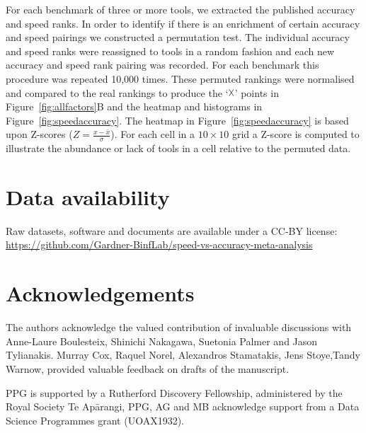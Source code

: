 \documentclass[fleqn,10pt]{SelfArx} %
\begin{document}
For each benchmark of three or more tools, we extracted the published
accuracy and speed ranks. In order to identify if there is an
enrichment of certain accuracy and speed pairings we constructed a
permutation test. The individual accuracy and speed ranks were
reassigned to tools in a random fashion and each new accuracy and
speed rank pairing was recorded. For each benchmark this procedure was
repeated 10,000 times. These permuted rankings were normalised and
compared to the real rankings to produce the ‘$\vartimes$’ points in
Figure~\ref{fig:allfactors}B and the heatmap and histograms in
Figure~\ref{fig:speedaccuracy}. The heatmap in
Figure~\ref{fig:speedaccuracy} is based upon Z-scores
($Z=\frac{x-\bar{x}}{\sigma}$). For each cell in a $10\times 10$ grid
a Z-score is computed to illustrate the abundance or lack of tools in
a cell relative to the permuted data.

\section*{Data availability}
Raw datasets, software and documents are available under a CC-BY license:\\
\fussy
\url{https://github.com/Gardner-BinfLab/speed-vs-accuracy-meta-analysis}
\sloppy

\section*{Acknowledgements}

The authors acknowledge the valued contribution of invaluable
discussions with Anne-Laure Boulesteix, Shinichi Nakagawa, Suetonia
Palmer and Jason Tylianakis. Murray Cox, Raquel
Norel, Alexandros Stamatakis, Jens Stoye,Tandy Warnow, provided
valuable feedback on drafts of the manuscript.

PPG is supported by a Rutherford Discovery Fellowship,
administered by the Royal Society Te Ap\=arangi, 
PPG, AG and MB acknowledge support from a Data Science Programmes grant
(UOAX1932).




\end{document}
